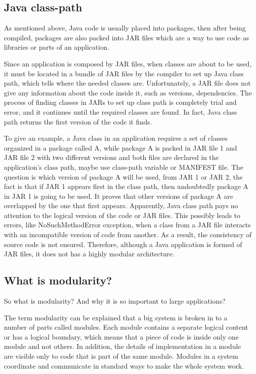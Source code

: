 \subsection{Java class-path}
As mentioned above, Java code is usually placed into packages, then after being compiled, packages are also packed into JAR files which are a way to use code as libraries or parts of an application. 

Since an application is composed by JAR files, when classes are about to be used, it must be located in a bundle of JAR files by the compiler to set up Java class path, which tells where the needed classes are. Unfortunately, a JAR file does not give any information about the code inside it, such as versions, dependencies. The process of finding classes in JARs to set up class path is completely trial and error, and it continues until the required classes are found. In fact, Java class path returns the first version of the code it finds. 

To give an example, a Java class in an application requires a set of classes organized in a package called A, while package A is packed in JAR file 1 and JAR file 2 with two different versions and both files are declared in the application's class path, maybe use class-path variable or MANIFEST file. The question is which version of package A will be used, from JAR 1 or JAR 2, the fact is that if JAR 1 appears first in the class path, then undoubtedly package A in JAR 1 is going to be used. It proves that other versions of package A are overlapped by the one that first appears. Apparently, Java class path pays no attention to the logical version of the code or JAR files. This possibly leads to  errors, like NoSuchMethodError exception, when a class from a JAR file interacts with an incompatible version of code from another. As a result, the consistency of source code is not ensured. Therefore, although a Java application is formed of JAR files, it does not has a highly modular architecture.


\subsection{What is modularity?}
So what is modularity? And why it is so important to large applications?

The term modularity can be explained that a big system is broken in to a number of parts called modules. Each module contains a separate logical content or has a logical boundary, which means that a piece of code is inside only one module and not others. In addition, the details of implementation in a module are visible only to code that is part of the same module. Modules in a system coordinate and communicate in standard ways to make the whole system work. 

